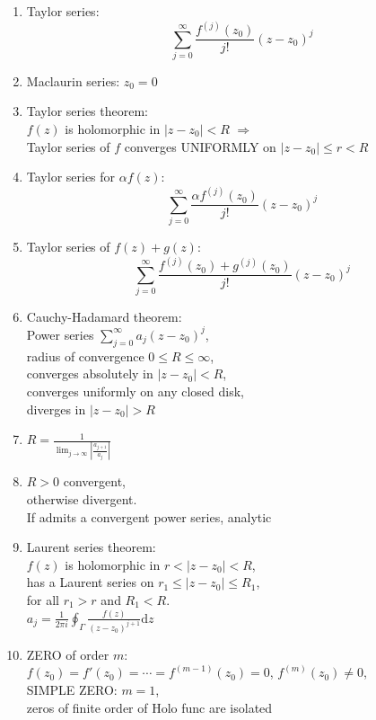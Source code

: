 \documentclass[11pt,a4paper]{article}
\begin{document}
\begin{multicols}{2}
\begin{enumerate}[resume]
\item Taylor series: $$\sum_{j=0}^{\infty} \frac{f^{(j)} (z_0)}{j!} (z-z_0)^{j}$$

\item Maclaurin series: $z_0=0$

\item Taylor series theorem: \\$f(z)$ is holomorphic in $|z-z_0| <R$ $\Rightarrow$ \\Taylor series of $f$ converges UNIFORMLY on $|z-z_0| \leq r < R$

\item Taylor series for $\alpha f(z)$: $$\sum_{j=0}^{\infty} \frac{\alpha f^{(j)} (z_0)}{j!} (z-z_0)^j$$

\item Taylor series of $f(z) + g(z)$: $$\sum_{j=0}^{\infty} \frac{f^{(j)} (z_0) + g^{(j)} (z_0)}{j!} (z-z_0)^j$$

\item Cauchy-Hadamard theorem: \\Power series $\sum_{j=0}^{\infty} a_j (z-z_0)^j$, \\radius of convergence $0 \leq R \leq \infty$, \\converges absolutely in $|z-z_0| <R$, \\converges uniformly on any closed disk, \\diverges in $|z-z_0| >R$

\item $\displaystyle R= \frac{1}{\lim_{j \to \infty} \left| \frac{a_{j+1}}{a_j} \right|}$

\item $R>0$ convergent, \\otherwise divergent. \\If admits a convergent power series, analytic

\item Laurent series theorem: \\$f(z)$ is holomorphic in $r < |z-z_0| <R$, \\has a Laurent series on $r_1 \leq |z-z_0| \leq R_1$, \\for all $r_1 >r$ and $R_1 <R$. \\$a_j = \displaystyle \frac{1}{2 \pi i} \oint_{\Gamma} \frac{f(z)}{(z-z_0)^{j+1}} \mathrm{d}z$

\item ZERO of order $m$: \\$f(z_0) = f'(z_0) = \cdots = f^{(m-1)}(z_0) = 0$, $f^{(m)}(z_0) \neq 0$, \\SIMPLE ZERO: $m=1$, \\zeros of finite order of Holo func are isolated


\end{enumerate}
\end{multicols}
\end{document}
